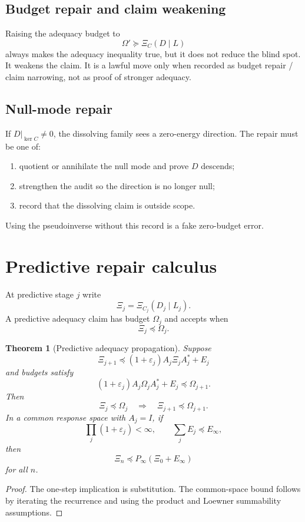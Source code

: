\documentclass[11pt]{article}
\newtheorem{theorem}{Theorem}
\begin{document}
\subsection{Budget repair and claim weakening}
Raising the adequacy budget to
\[
\Omega'\succeq\Xi_C(D\mid L)
\]
always makes the adequacy inequality true, but it does not reduce the blind spot.  It weakens the claim.  It is a lawful move only when recorded as budget repair / claim narrowing, not as proof of stronger adequacy.

\subsection{Null-mode repair}
If $D|_{\ker C}\ne0$, the dissolving family sees a zero-energy direction.  The repair must be one of:
\begin{enumerate}[label=(\roman*)]
\item quotient or annihilate the null mode and prove $D$ descends;
\item strengthen the audit so the direction is no longer null;
\item record that the dissolving claim is outside scope.
\end{enumerate}
Using the pseudoinverse without this record is a fake zero-budget error.

\section{Predictive repair calculus}
At predictive stage $j$ write
\[
\Xi_j=\Xi_{C_j}(D_j\mid L_j).
\]
A predictive adequacy claim has budget $\Omega_j$ and accepts when
\[
\Xi_j\preceq\Omega_j.
\]

\begin{theorem}[Predictive adequacy propagation]
Suppose
\[
\Xi_{j+1}\preceq (1+\varepsilon_j)A_j\Xi_jA_j^*+E_j
\]
and budgets satisfy
\[
(1+\varepsilon_j)A_j\Omega_jA_j^*+E_j\preceq \Omega_{j+1}.
\]
Then
\[
\Xi_j\preceq\Omega_j\quad\Longrightarrow\quad \Xi_{j+1}\preceq\Omega_{j+1}.
\]
In a common response space with $A_j=I$, if
\[
\prod_j(1+\varepsilon_j)<\infty,
\qquad
\sum_j E_j\preceq E_\infty,
\]
then
\[
\Xi_n\preceq P_\infty(\Xi_0+E_\infty)
\]
for all $n$.
\end{theorem}

\begin{proof}
The one-step implication is substitution.  The common-space bound follows by iterating the recurrence and using the product and Loewner summability assumptions.
\end{proof}
\end{document}
